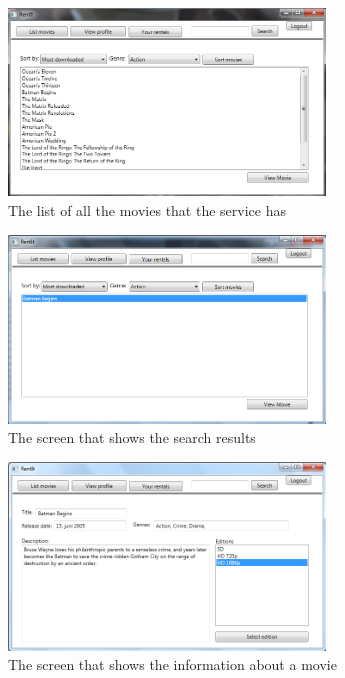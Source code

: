 \begin{figure}[h!]
  \centering
    \includegraphics[width=0.75\textwidth]{Parts/Appendix/Images/Listmovies}
  \caption{The list of all the movies that the service has}
  \label{fig:Appendix_GUI_PrototypeAllmovies}
\end{figure}

\begin{figure}[h!]
  \centering
    \includegraphics[width=0.75\textwidth]{Parts/Appendix/Images/Search}
  \caption{The screen that shows the search results}
  \label{fig:Appendix_GUI_PrototypeSearch}
\end{figure}

\begin{figure}[h!]
  \centering
    \includegraphics[width=0.75\textwidth]{Parts/Appendix/Images/Viewmovie}
  \caption{The screen that shows the information about a movie}
  \label{fig:Appendix_GUI_PrototypeViewmovie}
\end{figure}

